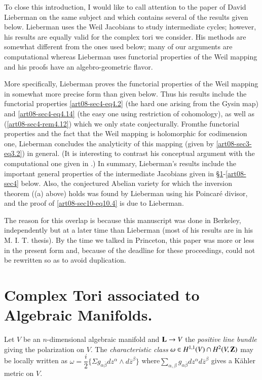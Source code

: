 To close this introduction, I would like to call attention to the paper of David Lieberman \cite{art08-key20} on the same subject and which contains several of the results given below. Lieberman uses the Weil Jacobians \cite{art08-key22} to study intermediate cycles; however, his results are equally valid for the complex tori we consider. His methods are somewhat different from the ones used below; many of our arguments are computational whereas Lieberman uses functorial properties of the Weil mapping and his proofs have an algebro-geometric flavor.

More specifically, Lieberman proves the functorial properties of the Weil mapping in somewhat more precise form than given below. Thus his results include the functorial properties \eqref{art08-sec4-eq4.2} (the hard one arising from the Gysin map) and \eqref{art08-sec4-eq4.14} (the easy one using restriction of cohomology), as well as (\ref{art08-sec4-rem4.12}) which we only state conjecturally. From\pageoriginale the functorial properties and the fact that the Weil mapping is holomorphic for codimension one, Lieberman concludes the analyticity of this mapping (given by \eqref{art08-sec3-eq3.2}) in general. (It is interesting to contrast his conceptual argument with the computational one given in \cite{art08-key9}.) In summary, Lieberman's results include the important general properties of the intermediate Jacobians given in \S\ref{art08-sec1}-\ref{art08-sec4} below. Also, the conjectured Abelian variety for which the inversion theorem ((a) above) holds was found by Lieberman using his Poincar\'e divisor, and the proof of \eqref{art08-sec10-eq10.4} is due to Lieberman.

The reason for this overlap is because this manuscript was done in Berkeley, independently but at a later time than Lieberman (most of his results are in his M. I. T. thesis). By the time we talked in Princeton, this paper was more or less in the present form and, because of the deadline for these proceedings, could not be rewritten so as to avoid duplication.


\tableofcontents

\section{Complex Tori associated to Algebraic Manifolds.}\label{art08-sec1}\pageoriginale

Let $V$ be an $n$-dimensional algebraic manifold and $\mathbf{L}\to V$ the {\em positive line bundle} giving the polarization on $V$. The {\em characteristic class} $\omega \in H^{1,1}(V)\cap H^{2}(V,\mathbf{Z})$ may be locally written as $\omega=\dfrac{i}{2}\{\Sigma g_{\alpha\overline{\beta}}dz^{\alpha}\wedge d\overline{z}^{\beta}\}$ where\pageoriginale $\sum\limits_{\alpha,\beta}g_{\alpha\overline{\beta}}dz^{\alpha}d\overline{z}^{\beta}$ gives a K\"ahler metric on $V$.

